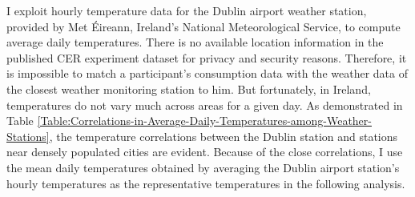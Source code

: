 I exploit hourly temperature data for the Dublin airport weather station, provided by Met \'{E}ireann, Ireland's National Meteorological Service, to compute average daily temperatures. There is no available location information in the published CER experiment dataset for privacy and security reasons. Therefore, it is impossible to match a participant's consumption data with the weather data of the closest weather monitoring station to him. But fortunately, in Ireland, temperatures do not vary much across areas for a given day. As demonstrated in Table \ref{Table:Correlations-in-Average-Daily-Temperatures-among-Weather-Stations}, the temperature correlations between the Dublin station and stations near densely populated cities are evident. Because of the close correlations, I use the mean daily temperatures obtained by averaging the Dublin airport station's hourly temperatures as the representative temperatures in the following analysis. 

